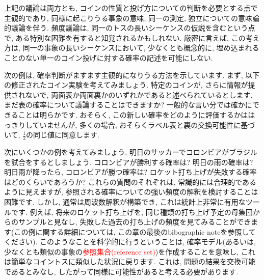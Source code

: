 \documentclass[10pt,dvipdfmx,a4]{beamer}
\newcommand{\tcr}[1]{\textcolor{red}{#1}}
\begin{document}

\begin{frame}
上記の議論は両方とも, コインの性質と投げ方についての判断を必要とする点で主観的であり, 同様に起こりうる事象の意味, 同一の測定, 独立についての意味論的議論を伴う.
頻度議論は, 同一のトスの長いシーケンスの仮説を含むという点で, ある特別な困難を有すると知覚されるかもしれない.
厳密に言えば, この考え方は, 同一の事象の長いシーケンスにおいて, 少なくとも概念的に, 埋め込まれることのない単一のコイン投げに対する確率の記述を可能にしない.

次の例は, 確率判断がますます主観的になりうる方法を示しています.
まず, 以下の修正されたコイン実験を考えてみましょう.
特定のコインが, さらに情報が提供されないで, 両面表か両面裏かのいずれかであると述べられているとします.
まだ表の確率について議論することはできますか?
一般的な言い分では確かにできることは明らかです.
おそらく, この新しい確率をどのように評価するかははっきりしていませんが, 多くの場合, おそらくラベル表と裏の交換可能性に基づいて, $\tfrac{1}{2}$の同じ値に同意します.
\end{frame}


\begin{frame}
次にいくつかの例を考えてみましょう.
明日のサッカーでコロンビアがブラジルを試合をするとしましょう.
コロンビアが勝利する確率は?
明日の雨の確率は?
明日雨が降ったら, コロンビアが勝つ確率は?
ロケット打ち上げが失敗する確率はどのくらいであろうか?
これらの質問のそれぞれは, 常識的には合理的であるように見えますが, 参照される確率についての強い頻度の解釈を検討することは困難です.
しかし, 通常は周波数解釈が構築でき, これは統計上非常に有用なツールです.
例えば, 将来のロケット打ち上げを, 同じ種類の打ち上げ予定の母集団からのサンプルと見なし, 失敗した過去の打ち上げの頻度を見てみることができます(この例に関する詳細については, この章の最後のbibographic noteを参照してください).
このようなことを科学的に行うということは, 確率モデル(あるいは, 少なくとも類似の事象の\tcr{参照集合(reference set)})を作成することを意味し, これは簡単なコイントスに類似した状況に戻ります.
これは, 問題の結果を交換可能であるとみなし, したがって同様に可能性があると考える必要があります.
\end{frame}

\end{document}
